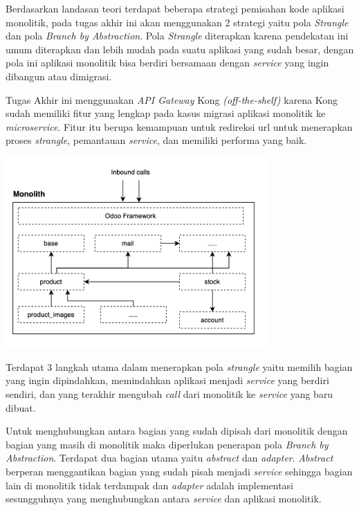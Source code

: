 Berdasarkan landasan teori terdapat beberapa strategi pemisahan kode aplikasi monolitik, pada tugas akhir ini akan menggunakan 2 strategi yaitu pola \textit{Strangle} dan pola \textit{Branch by Abstraction}. Pola \textit{Strangle} diterapkan karena pendekatan ini umum diterapkan dan lebih mudah pada suatu aplikasi yang sudah besar, dengan pola ini aplikasi monolitik bisa berdiri bersamaan dengan \textit{service} yang ingin dibangun atau dimigrasi. 

Tugas Akhir ini menggunakan \textit{API Gateway} Kong \textit{(off-the-shelf)} karena Kong sudah memiliki fitur yang lengkap pada kasus migrasi aplikasi monolitik ke \textit{microservice}. Fitur itu berupa kemampuan untuk redireksi url untuk menerapkan proses \textit{strangle}, pemantauan \textit{service}, dan memiliki performa yang baik.

\begin{center}
	\includegraphics[width=10cm]{img/bab_3/strangelExMono.png}
	\label{fig:asd}
\end{center}

Terdapat 3 langkah utama dalam menerapkan pola \textit{strangle} yaitu memilih bagian yang ingin dipindahkan, memindahkan aplikasi menjadi \textit{service} yang berdiri sendiri, dan yang terakhir mengubah \textit{call} dari monolitik ke \textit{service} yang baru dibuat.
 
Untuk menghubungkan antara bagian yang sudah dipisah dari monolitik dengan bagian yang masih di monolitik maka diperlukan penerapan pola \textit{Branch by Abstraction}. Terdapat dua bagian utama yaitu \textit{abstract} dan \textit{adapter}. \textit{Abstract} berperan menggantikan bagian yang sudah pisah menjadi \textit{service} sehingga bagian lain di monolitik tidak terdampak dan \textit{adapter} adalah implementasi sesungguhnya yang menghubungkan antara \textit{service} dan aplikasi monolitik.

